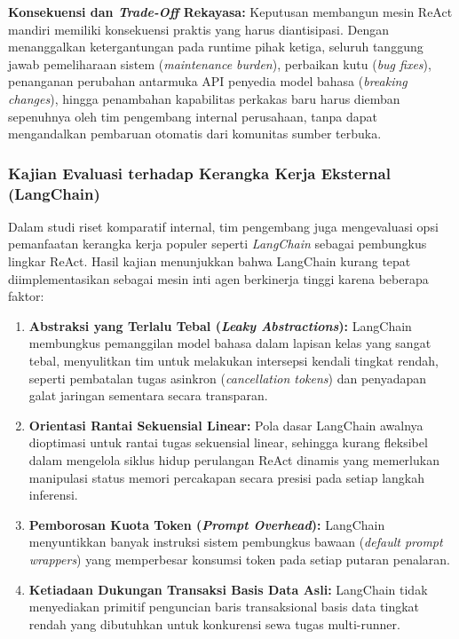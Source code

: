 \textbf{Konsekuensi dan \textit{Trade-Off} Rekayasa:} Keputusan membangun mesin ReAct mandiri memiliki konsekuensi praktis yang harus diantisipasi. Dengan menanggalkan ketergantungan pada runtime pihak ketiga, seluruh tanggung jawab pemeliharaan sistem (\textit{maintenance burden}), perbaikan kutu (\textit{bug fixes}), penanganan perubahan antarmuka API penyedia model bahasa (\textit{breaking changes}), hingga penambahan kapabilitas perkakas baru harus diemban sepenuhnya oleh tim pengembang internal perusahaan, tanpa dapat mengandalkan pembaruan otomatis dari komunitas sumber terbuka.

\subsubsection{Kajian Evaluasi terhadap Kerangka Kerja Eksternal (LangChain)}
Dalam studi riset komparatif internal, tim pengembang juga mengevaluasi opsi pemanfaatan kerangka kerja populer seperti \textit{LangChain} sebagai pembungkus lingkar ReAct. Hasil kajian menunjukkan bahwa LangChain kurang tepat diimplementasikan sebagai mesin inti agen berkinerja tinggi karena beberapa faktor:
\begin{enumerate}[label=\alph*.]
  \item \textbf{Abstraksi yang Terlalu Tebal (\textit{Leaky Abstractions}):} LangChain membungkus pemanggilan model bahasa dalam lapisan kelas yang sangat tebal, menyulitkan tim untuk melakukan intersepsi kendali tingkat rendah, seperti pembatalan tugas asinkron (\textit{cancellation tokens}) dan penyadapan galat jaringan sementara secara transparan.
  \item \textbf{Orientasi Rantai Sekuensial Linear:} Pola dasar LangChain awalnya dioptimasi untuk rantai tugas sekuensial linear, sehingga kurang fleksibel dalam mengelola siklus hidup perulangan ReAct dinamis yang memerlukan manipulasi status memori percakapan secara presisi pada setiap langkah inferensi.
  \item \textbf{Pemborosan Kuota Token (\textit{Prompt Overhead}):} LangChain menyuntikkan banyak instruksi sistem pembungkus bawaan (\textit{default prompt wrappers}) yang memperbesar konsumsi token pada setiap putaran penalaran.
  \item \textbf{Ketiadaan Dukungan Transaksi Basis Data Asli:} LangChain tidak menyediakan primitif penguncian baris transaksional basis data tingkat rendah yang dibutuhkan untuk konkurensi sewa tugas multi-runner.
\end{enumerate}

